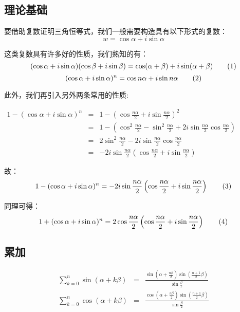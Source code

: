 
\begin{issues}
\issueTODO
\end{issues}


\subsection{理论基础}
要借助复数证明三角恒等式，我们一般需要构造具有以下形式的复数：
$$w=\cos \alpha+i\sin\alpha$$

这类复数具有许多好的性质，我们熟知的有：
$$(\cos\alpha+i\sin\alpha)(\cos\beta+i\sin\beta)=\cos(\alpha+\beta)+i\sin(\alpha+\beta)\\\tag{1} $$
$$
(\cos\alpha+i\sin\alpha)^n=\cos n\alpha+i\sin n\alpha\\\tag{2}$$

此外，我们再引入另外两条常用的性质:

$\displaystyle{\begin{eqnarray*} 1-(\cos\alpha+i\sin\alpha)^n&=&1-\left(\cos{\frac{n\alpha}2+i\sin{\frac{n\alpha}2}}\right)^{2}\\ &=&1-\left(\cos^2{\frac{n\alpha}2}-\sin^2{\frac{n\alpha}2}+2i\sin{\frac{n\alpha}2}\cos{\frac{n\alpha}2}\right)\\ &=&2\sin^2{\frac{n\alpha}2}-2i\sin{\frac{n\alpha}2}\cos{\frac{n\alpha}2}\\ &=&-2i\sin{\frac{n\alpha}2}\left(\cos{\frac{n\alpha}2}+i\sin{\frac{n\alpha}2}\right) \end{eqnarray*}}$ 

故：
$$1-(\cos\alpha+i\sin\alpha)^n=-2i\sin{\frac{n\alpha}2}\left(\cos{\frac{n\alpha}2}+i\sin{\frac{n\alpha}2}\right)\\\tag{3}$$

同理可得：
$$
1+(\cos\alpha+i\sin\alpha)^n=2\cos{\frac{n\alpha}2}\left(\cos{\frac{n\alpha}2}+i\sin{\frac{n\alpha}2}\right)\\\tag{4}$$

\subsection{累加}
$$\begin{eqnarray*}\sum_{k=0}^n\sin(\alpha+k\beta)&=&\frac{\sin\left(\alpha+\frac{n\beta}2\right)\sin\left(\frac{n+1}2\beta\right)}{\sin\frac{\beta}2}\\\sum_{k=0}^n\cos(\alpha+k\beta)&=&\frac{\cos\left(\alpha+\frac{n\beta}2\right)\sin\left(\frac{n+1}2\beta\right)}{\sin\frac{\beta}2} \tag{1} \end{eqnarray*}$$

